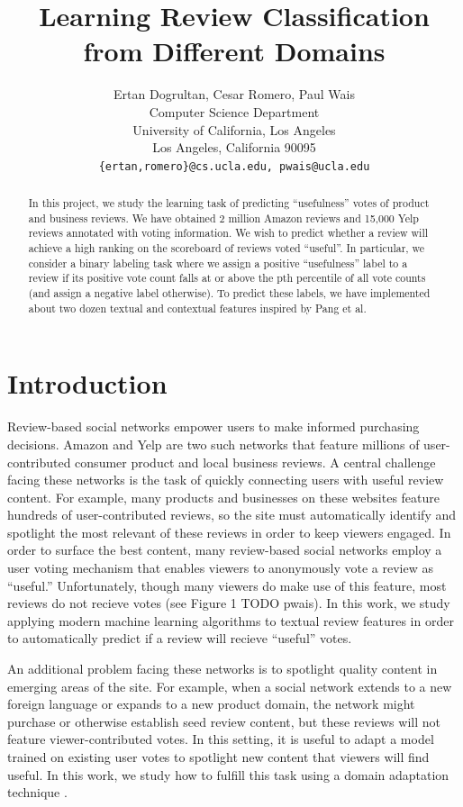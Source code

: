 \documentclass[letterpaper]{article}
\title{Learning Review Classification from Different Domains}
\author{Ertan Dogrultan, Cesar Romero, Paul Wais\\
Computer Science Department \\
University of California, Los Angeles\\
Los Angeles, California 90095\\
\texttt{\{ertan,romero\}@cs.ucla.edu, pwais@ucla.edu}}
\begin{document}
\maketitle
\begin{abstract}
  In this project, we study the learning task of predicting
  ``usefulness'' votes of product and business reviews.  We have
  obtained 2 million Amazon reviews and 15,000 Yelp reviews annotated
  with voting information.  We wish to predict whether a review will
  achieve a high ranking on the scoreboard of reviews voted
  ``useful''.  In particular, we consider a binary labeling task where
  we assign a positive ``usefulness'' label to a review if its
  positive vote count falls at or above the pth percentile of all vote
  counts (and assign a negative label otherwise).  To predict these
  labels, we have implemented about two dozen textual and contextual
  features inspired by Pang et al. \cite{PangSentimentClassification}
\end{abstract}

\section{Introduction}
\label{sec:introduction}

Review-based social networks empower users to make informed purchasing
decisions.  Amazon and Yelp are two such networks that feature
millions of user-contributed consumer product and local business
reviews.  A central challenge facing these networks is the task of
quickly connecting users with useful review content.  For example,
many products and businesses on these websites feature hundreds of
user-contributed reviews, so the site must automatically identify and
spotlight the most relevant of these reviews in order to keep viewers
engaged.  In order to surface the best content, many review-based
social networks employ a user voting mechanism that enables viewers to
anonymously vote a review as ``useful.''  Unfortunately, though many
viewers do make use of this feature, most reviews do not recieve votes
(see Figure 1 TODO pwais).  In this work, we study applying modern
machine learning algorithms to textual review features in order to
automatically predict if a review will recieve ``useful'' votes.

An additional problem facing these networks is to spotlight quality
content in emerging areas of the site.  For example, when a social
network extends to a new foreign language or expands to a new product
domain, the network might purchase or otherwise establish seed review
content, but these reviews will not feature viewer-contributed votes.
In this setting, it is useful to adapt a model trained on existing
user votes to spotlight new content that viewers will find useful.  In
this work, we study how to fulfill this task using a domain adaptation
technique \cite{JennLearnDiffDomains}.
\end{document}
